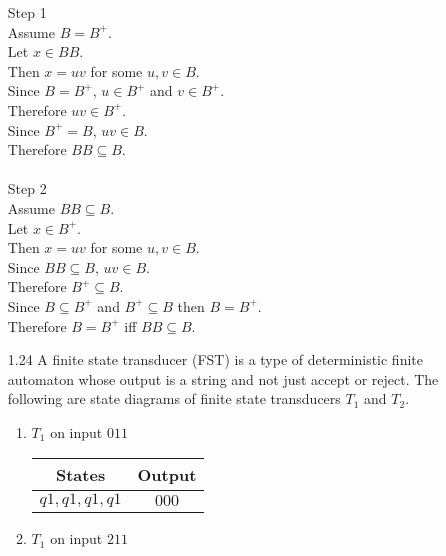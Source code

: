 \begin{enumerate}
          Step 1\\
          Assume $B = B^+$. \\
          Let $x \in BB$. \\
          Then $x = uv$ for some $u,v \in B$. \\
          Since $B = B^+$, $u \in B^+$ and $v \in B^+$. \\
          Therefore $uv \in B^+$. \\
          Since $B^+ = B$, $uv \in B$. \\
          Therefore $BB \subseteq B$. \\
          \\
          Step 2\\
          Assume $BB \subseteq B$. \\
          Let $x \in B^+$. \\
          Then $x = uv$ for some $u,v \in B$. \\
          Since $BB \subseteq B$, $uv \in B$. \\
          Therefore $B^+ \subseteq B$. \\
          Since $B \subseteq B^+$ and $B^+ \subseteq B$ then $B = B^+$. \\
          Therefore $B = B^+$ iff $BB \subseteq B$. \\
    \item [1.24]
          A finite state transducer (FST) is a type of deterministic finite automaton whose output is a string and not just accept or reject. The following are state diagrams of finite state transducers $T_1$ and $T_2$.
          \begin{enumerate}
              \item $T_1$ on input $011$
                    \begin{table}[H]
                        \centering
                        \begin{tabular}{|c|c|}
                            \hline
                            States        & Output \\
                            \hline
                            $q1,q1,q1,q1$ & $000$  \\
                            \hline
                        \end{tabular}
                    \end{table}
              \item $T_1$ on input $211$
                    \begin{table}[H]
                        \centering

\end{table}
\end{enumerate}
\end{enumerate}
